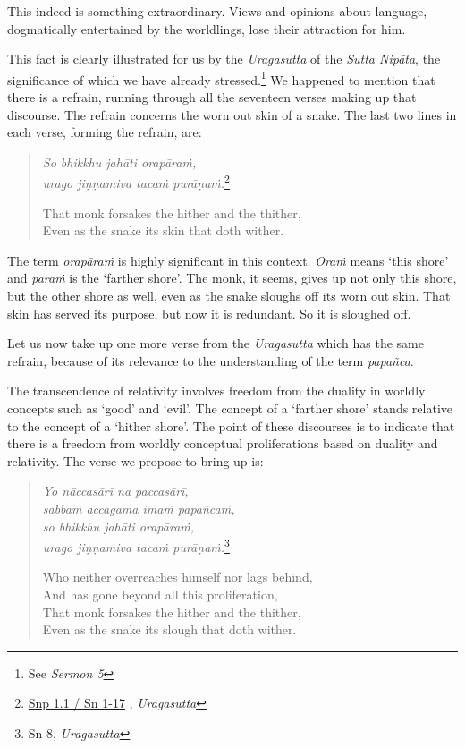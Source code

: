 This indeed is something extraordinary. Views and opinions about language, dogmatically entertained by the worldlings, lose their attraction for him.

This fact is clearly illustrated for us by the \emph{Uragasutta} of the \emph{Sutta Nipāta}, the significance of which we have already stressed.\footnote{See \emph{Sermon 5}} We happened to mention that there is a refrain, running through all the seventeen verses making up that discourse. The refrain concerns the worn out skin of a snake. The last two lines in each verse, forming the refrain, are:

\begin{quote}
\emph{So bhikkhu jahāti orapāraṁ,}\\
\emph{urago jiṇṇamiva tacaṁ purāṇaṁ.}\footnote{\href{https://suttacentral.net/snp1.1/pli/ms}{Snp 1.1 / Sn 1-17} , \emph{Uragasutta}}

That monk forsakes the hither and the thither,\\
Even as the snake its skin that doth wither.
\end{quote}

The term \emph{orapāraṁ} is highly significant in this context. \emph{Oraṁ} means `this shore' and \emph{paraṁ} is the `farther shore'. The monk, it seems, gives up not only this shore, but the other shore as well, even as the snake sloughs off its worn out skin. That skin has served its purpose, but now it is redundant. So it is sloughed off.

Let us now take up one more verse from the \emph{Uragasutta} which has the same refrain, because of its relevance to the understanding of the term \emph{papañca}.

The transcendence of relativity involves freedom from the duality in worldly concepts such as `good' and `evil'. The concept of a `farther shore' stands relative to the concept of a `hither shore'. The point of these discourses is to indicate that there is a freedom from worldly conceptual proliferations based on duality and relativity. The verse we propose to bring up is:

\begin{quote}
\emph{Yo nāccasārī na paccasārī,}\\
\emph{sabbaṁ accagamā imaṁ papañcaṁ,}\\
\emph{so bhikkhu jahāti orapāraṁ,}\\
\emph{urago jiṇṇamiva tacaṁ purāṇaṁ.}\footnote{Sn 8, \emph{Uragasutta}}

Who neither overreaches himself nor lags behind,\\
And has gone beyond all this proliferation,\\
That monk forsakes the hither and the thither,\\
Even as the snake its slough that doth wither.
\end{quote}


